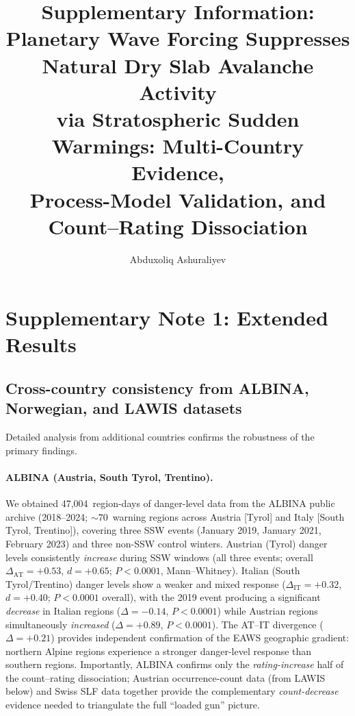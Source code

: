 \documentclass[11pt,letterpaper]{article}
\title{Supplementary Information:\\
Planetary Wave Forcing Suppresses Natural Dry Slab Avalanche Activity\\
via Stratospheric Sudden Warmings: Multi-Country Evidence,\\
Process-Model Validation, and Count--Rating Dissociation}
\author{Abduxoliq Ashuraliyev}
\date{}
\begin{document}
\maketitle

\tableofcontents
\clearpage

\section{Supplementary Note 1: Extended Results}

\subsection{Cross-country consistency from ALBINA, Norwegian, and LAWIS datasets}

Detailed analysis from additional countries confirms the robustness of the primary findings. 

\paragraph{ALBINA (Austria, South Tyrol, Trentino).} We obtained 47,004~region-days of danger-level data from the ALBINA public archive (2018--2024; ${\sim}70$~warning regions across Austria [Tyrol] and Italy [South Tyrol, Trentino]), covering three SSW events (January 2019, January 2021, February 2023) and three non-SSW control winters. Austrian (Tyrol) danger levels consistently \emph{increase} during SSW windows (all three events; overall $\Delta_{\mathrm{AT}} = +0.53$, $d = +0.65$; $P < 0.0001$, Mann--Whitney). Italian (South Tyrol/Trentino) danger levels show a weaker and mixed response ($\Delta_{\mathrm{IT}} = +0.32$, $d = +0.40$; $P < 0.0001$ overall), with the 2019 event producing a significant \emph{decrease} in Italian regions ($\Delta = -0.14$, $P < 0.0001$) while Austrian regions simultaneously \emph{increased} ($\Delta = +0.89$, $P < 0.0001$). The AT--IT divergence ($\Delta = +0.21$) provides independent confirmation of the EAWS geographic gradient: northern Alpine regions experience a stronger danger-level response than southern regions. Importantly, ALBINA confirms only the \emph{rating-increase} half of the count--rating dissociation; Austrian occurrence-count data (from LAWIS below) and Swiss SLF data together provide the complementary \emph{count-decrease} evidence needed to triangulate the full ``loaded gun'' picture.
\end{document}
